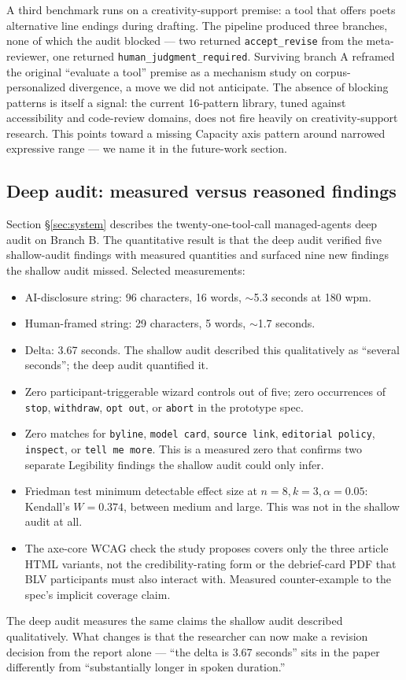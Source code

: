 A third benchmark runs on a creativity-support premise: a tool that offers poets alternative line endings during drafting. The pipeline produced three branches, none of which the audit blocked --- two returned \texttt{accept\_revise} from the meta-reviewer, one returned \texttt{human\_judgment\_required}. Surviving branch A reframed the original ``evaluate a tool'' premise as a mechanism study on corpus-personalized divergence, a move we did not anticipate. The absence of blocking patterns is itself a signal: the current 16-pattern library, tuned against accessibility and code-review domains, does not fire heavily on creativity-support research. This points toward a missing Capacity axis pattern around narrowed expressive range --- we name it in the future-work section.

\subsection{Deep audit: measured versus reasoned findings}

Section \S\ref{sec:system} describes the twenty-one-tool-call managed-agents deep audit on Branch B. The quantitative result is that the deep audit verified five shallow-audit findings with measured quantities and surfaced nine new findings the shallow audit missed. Selected measurements:

\begin{itemize}
    \item AI-disclosure string: 96 characters, 16 words, $\sim$5.3 seconds at 180 wpm.
    \item Human-framed string: 29 characters, 5 words, $\sim$1.7 seconds.
    \item Delta: 3.67 seconds. The shallow audit described this qualitatively as ``several seconds''; the deep audit quantified it.
    \item Zero participant-triggerable wizard controls out of five; zero occurrences of \texttt{stop}, \texttt{withdraw}, \texttt{opt out}, or \texttt{abort} in the prototype spec.
    \item Zero matches for \texttt{byline}, \texttt{model card}, \texttt{source link}, \texttt{editorial policy}, \texttt{inspect}, or \texttt{tell me more}. This is a measured zero that confirms two separate Legibility findings the shallow audit could only infer.
    \item Friedman test minimum detectable effect size at $n=8, k=3, \alpha=0.05$: Kendall's $W = 0.374$, between medium and large. This was not in the shallow audit at all.
    \item The axe-core WCAG check the study proposes covers only the three article HTML variants, not the credibility-rating form or the debrief-card PDF that BLV participants must also interact with. Measured counter-example to the spec's implicit coverage claim.
\end{itemize}

The deep audit measures the same claims the shallow audit described qualitatively. What changes is that the researcher can now make a revision decision from the report alone --- ``the delta is 3.67 seconds'' sits in the paper differently from ``substantially longer in spoken duration.''
